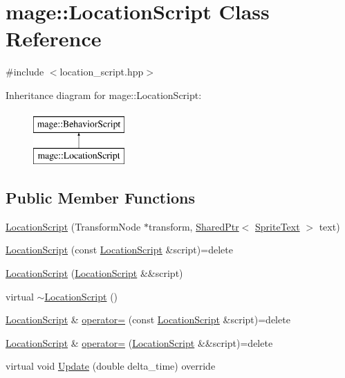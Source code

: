 \hypertarget{classmage_1_1_location_script}{}\section{mage\+:\+:Location\+Script Class Reference}
\label{classmage_1_1_location_script}


{\ttfamily \#include $<$location\+\_\+script.\+hpp$>$}

Inheritance diagram for mage\+:\+:Location\+Script\+:\begin{figure}[H]
\begin{center}
\leavevmode
\includegraphics[height=2.000000cm]{classmage_1_1_location_script}
\end{center}
\end{figure}
\subsection*{Public Member Functions}
\begin{DoxyCompactItemize}
\item 
\hyperlink{classmage_1_1_location_script_a14bc9a5868daff6401b0c8b4feebbb3e}{Location\+Script} (Transform\+Node $\ast$transform, \hyperlink{namespacemage_a1e01ae66713838a7a67d30e44c67703e}{Shared\+Ptr}$<$ \hyperlink{classmage_1_1_sprite_text}{Sprite\+Text} $>$ text)
\item 
\hyperlink{classmage_1_1_location_script_a53fb0562896eadb4c747d53b53f65b40}{Location\+Script} (const \hyperlink{classmage_1_1_location_script}{Location\+Script} \&script)=delete
\item 
\hyperlink{classmage_1_1_location_script_a6cddb54a11e5d5d6dee034ef04ffbf2f}{Location\+Script} (\hyperlink{classmage_1_1_location_script}{Location\+Script} \&\&script)
\item 
virtual \hyperlink{classmage_1_1_location_script_a95ed60a4bd7d228cc28ce1622f254d75}{$\sim$\+Location\+Script} ()
\item 
\hyperlink{classmage_1_1_location_script}{Location\+Script} \& \hyperlink{classmage_1_1_location_script_a49409b091dbd1b93830c46831be453fb}{operator=} (const \hyperlink{classmage_1_1_location_script}{Location\+Script} \&script)=delete
\item 
\hyperlink{classmage_1_1_location_script}{Location\+Script} \& \hyperlink{classmage_1_1_location_script_a6e2ad5cd12a984d38c66bbcc81fef94b}{operator=} (\hyperlink{classmage_1_1_location_script}{Location\+Script} \&\&script)=delete
\item 
virtual void \hyperlink{classmage_1_1_location_script_a3ffe0474c573e2cf858aee62056324a3}{Update} (double delta\+\_\+time) override
\end{DoxyCompactItemize}
